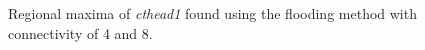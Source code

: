 \documentclass{InsightArticle}
\begin{document}
\begin{figure}[htbp]
\begin{center}
\caption{Regional maxima of {\em cthead1} found using the flooding method with connectivity of 4 and 8.\label{fig:cthead1}}
\end{center}
\end{figure}
\end{document}
